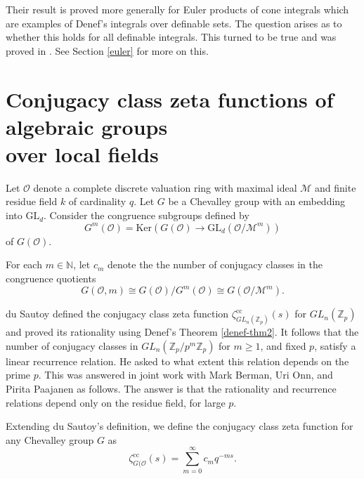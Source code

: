 \documentclass[12pt]{amsart}
\def\GL{\mathrm{GL}}
\def\cc{\mathrm{cc}}
\def\N{\mathbb{N}}
\def\Z{\mathbb{Z}}
\def\cM{\mathcal M}
\def\cO{\mathcal{O}}
\numberwithin{equation}{section}
\begin{document}
Their result is proved more generally for Euler products of cone integrals which are examples of Denef's integrals over definable sets. The question arises as to whether this holds for all definable integrals. This turned to be true and was proved in \cite{zeta1}. See Section \ref{euler} for more on this. 



\section{\bf Conjugacy class zeta functions of algebraic groups\\ over local fields}\label{conj}


Let $\mathcal{O}$ denote a complete discrete valuation ring with maximal ideal $\cM$ and finite residue field $k$ of cardinality $q$. 
Let $G$ be a Chevalley group with an embedding into $\GL_d$. Consider the
congruence subgroups defined by 
$$G^m(\mathcal{O})=\mathrm{Ker}(G(\cO)\to \mathrm{GL}_d(\cO/\cM^m))$$
of $G(\cO)$. 

For each $m \in \N$, let $c_m$ denote the the number
of conjugacy classes in the congruence quotients 
$$G(\cO,m)\cong G(\cO)/G^m(\cO)\cong G(\cO/\cM^m).$$

du Sautoy \cite{ds-conj} defined the conjugacy class zeta function $\zeta^{\cc}_{GL_n(\Z_p)}(s)$ 
for $GL_n(\Z_p)$ and proved its rationality using Denef's Theorem \ref{denef-thm2}. It follows that the number of conjugacy classes in $GL_n(\Z_p/p^m\Z_p)$ for $m\geq 1$, and fixed $p$, satisfy a linear recurrence relation. He asked to what extent this relation depends on the prime $p$. This was answered in joint work with Mark Berman, Uri Onn, and Pirita Paajanen  \cite{BDOP} as follows. The answer is that the rationality and recurrence relations depend only on the residue field, for 
large $p$.

Extending du Sautoy's definition, we define the conjugacy class zeta function for any Chevalley group $G$ as 
$$\zeta^{\cc}_{G(\cO}(s)=\sum_{m=0}^\infty c_m q^{-ms}.$$
\end{document}
